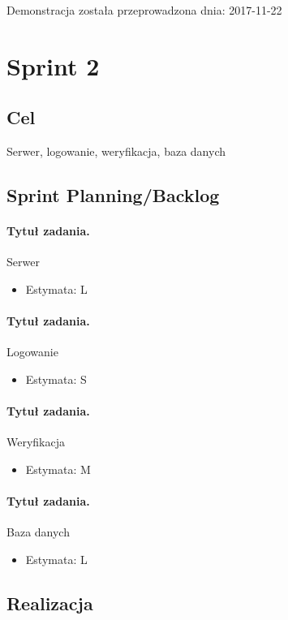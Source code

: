 \documentclass[a4paper]{article}
\begin{document}
Demonstracja została przeprowadzona dnia: 2017-11-22

\section{Sprint 2}

\subsection{Cel} Serwer, logowanie, weryfikacja, baza danych

\subsection{Sprint Planning/Backlog}

\paragraph{Tytuł zadania.} Serwer
\begin{itemize}
\item Estymata: L
\end{itemize}

\paragraph{Tytuł zadania.} Logowanie
\begin{itemize}
\item Estymata: S
\end{itemize}

\paragraph{Tytuł zadania.} Weryfikacja
\begin{itemize}
\item Estymata: M
\end{itemize}

\paragraph{Tytuł zadania.} Baza danych
\begin{itemize}
\item Estymata: L
\end{itemize}

\subsection{Realizacja}
\end{document}
